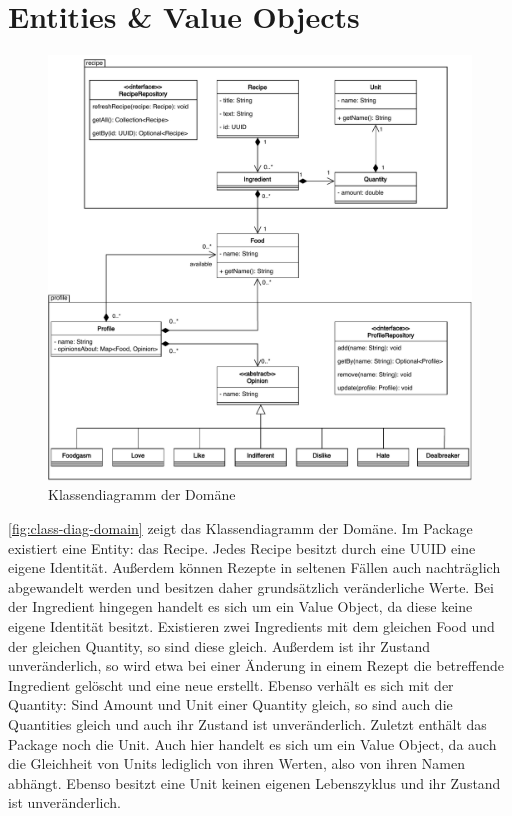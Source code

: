 \section{Entities \& Value Objects}

\begin{figure}[ht!]
    \includegraphics[width=0.98\columnwidth]{../diagrams/domain_uml.pdf}
    \caption{Klassendiagramm der Domäne}
    \label{fig:class-diag-domain}
\end{figure}

\autoref{fig:class-diag-domain} zeigt das Klassendiagramm der Domäne. Im Package  existiert eine Entity: das Recipe. Jedes Recipe besitzt durch eine UUID eine eigene Identität. Außerdem können Rezepte in seltenen Fällen auch nachträglich abgewandelt werden und besitzen daher grundsätzlich veränderliche Werte. Bei der Ingredient hingegen handelt es sich um ein Value Object, da diese keine eigene Identität besitzt. Existieren zwei Ingredients mit dem gleichen Food und der gleichen Quantity, so sind diese gleich. Außerdem ist ihr Zustand unveränderlich, so wird etwa bei einer Änderung in einem Rezept die betreffende Ingredient gelöscht und eine neue erstellt. Ebenso verhält es sich mit der Quantity: Sind Amount und Unit einer Quantity gleich, so sind auch die Quantities gleich und auch ihr Zustand ist unveränderlich. Zuletzt enthält das Package noch die Unit. Auch hier handelt es sich um ein Value Object, da auch die Gleichheit von Units lediglich von ihren Werten, also von ihren Namen abhängt. Ebenso besitzt eine Unit keinen eigenen Lebenszyklus und ihr Zustand ist unveränderlich.

